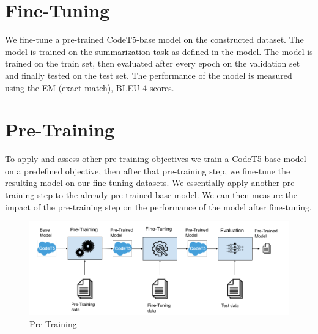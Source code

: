 \section{Fine-Tuning}
We fine-tune a pre-trained CodeT5-base model on the constructed dataset. The model is trained on the summarization task as defined in the model. The model is trained on the train set, then evaluated after every epoch on the validation set and finally tested on the test set. The performance of the model is measured using the EM (exact match), BLEU-4 scores.

\section{Pre-Training}
To apply and assess other pre-training objectives we train a CodeT5-base model on a predefined objective, then after that pre-training step, we fine-tune the resulting model on our fine tuning datasets. We essentially apply another pre-training step to the already pre-trained base model. We can then measure the impact of the pre-training step on the performance of the model after fine-tuning.

\label{fig:preTraining}
\begin{figure}[!h]
  \centering
  \includegraphics[width=\linewidth]{img/pre-training.png}
  \caption{Pre-Training}
\end{figure}

